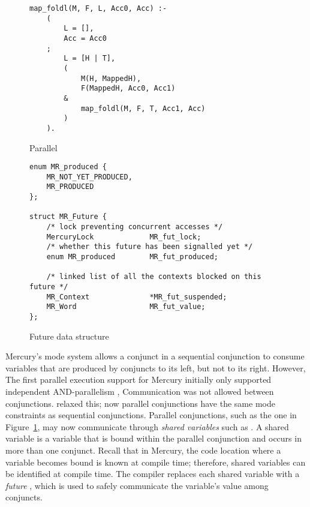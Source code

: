 

\begin{figure}
\begin{verbatim}
map_foldl(M, F, L, Acc0, Acc) :-
    (
        L = [],
        Acc = Acc0
    ;
        L = [H | T],
        (
            M(H, MappedH),
            F(MappedH, Acc0, Acc1)
        &
            map_foldl(M, F, T, Acc1, Acc)
        )
    ).
\end{verbatim}
\caption{Parallel \mapfoldl{}}
\label{fig:mapfoldl}
\end{figure}

\begin{figure}
\begin{verbatim}
enum MR_produced {
    MR_NOT_YET_PRODUCED, 
    MR_PRODUCED
};

struct MR_Future {
    /* lock preventing concurrent accesses */
    MercuryLock             MR_fut_lock;
    /* whether this future has been signalled yet */
    enum MR_produced        MR_fut_produced;

    /* linked list of all the contexts blocked on this future */
    MR_Context              *MR_fut_suspended;
    MR_Word                 MR_fut_value;
};
\end{verbatim}
\caption{Future data structure}
\label{fig:future}
\end{figure}

Mercury's mode system allows a conjunct in a sequential conjunction to consume
variables that are produced by conjuncts to its left, but not to its right.
However,
The first parallel execution support for Mercury
initially only supported independent AND-parallelism
\citep{conway:2002:par},
Communication was not allowed between conjunctions.
\citet*{wang:2011:dep-par,wang:2006:hons} relaxed this;
now parallel conjunctions have the same mode constraints as sequential
conjunctions.
Parallel conjunctions,
such as the one in Figure~\ref{fig:mapfoldl},
may now
communicate through \emph{shared variables} such as .
A shared variable is a variable that is bound within the parallel
conjunction and occurs in more than one conjunct.
Recall that in Mercury,
the code location where a variable becomes bound is known
at compile time;
therefore,
shared variables can be identified at compile time.
The compiler replaces each shared variable with a \emph{future}
\citep{halstead:1984:multilisp},
which is used to safely communicate the variable's value among conjuncts.

